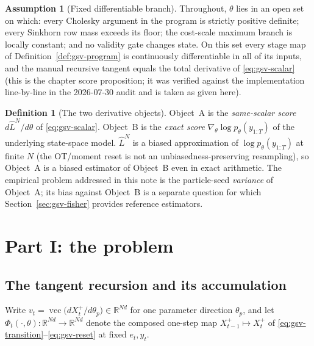 \documentclass[11pt]{article}
\theoremstyle{definition}
\newtheorem{definition}[proposition]{Definition}
\newtheorem{assumption}[proposition]{Assumption}
\theoremstyle{remark}
\begin{document}
\begin{assumption}[Fixed differentiable branch]
\label{ass:gsv-branch}
Throughout, $\theta$ lies in an open set on which: every Cholesky argument in
the program is strictly positive definite; every Sinkhorn row mass exceeds its
floor; the cost-scale maximum branch is locally constant; and no validity gate
changes state.  On this set every stage map of
Definition~\ref{def:gsv-program} is continuously differentiable in all of its
inputs, and the manual recursive tangent equals the total derivative of
\eqref{eq:gsv-scalar} (this is the chapter score proposition; it was verified
against the implementation line-by-line in the 2026-07-30 audit and is taken
as given here).
\end{assumption}

\begin{definition}[The two derivative objects]
\label{def:gsv-objects}
Object~A is the \emph{same-scalar score} $d\widehat L^N/d\theta$ of
\eqref{eq:gsv-scalar}.  Object~B is the \emph{exact score}
$\nabla_\theta \log p_\theta(y_{1:T})$ of the underlying state-space model.
$\widehat L^N$ is a biased approximation of $\log p_\theta(y_{1:T})$ at
finite $N$ (the OT/moment reset is not an unbiasedness-preserving
resampling), so Object~A is a biased estimator of Object~B even in exact
arithmetic.  The empirical problem addressed in this note is the
particle-seed \emph{variance} of Object~A; its bias against Object~B is a
separate question for which Section~\ref{sec:gsv-fisher} provides reference
estimators.
\end{definition}

\section{Part I: the problem}
\label{sec:gsv-problem}

\subsection{The tangent recursion and its accumulation}

Write $v_t=\operatorname{vec}\!\big(dX_t^{+}/d\theta_p\big)\in\mathbb{R}^{Nd}$
for one parameter direction $\theta_p$, and let
$\Phi_t(\cdot,\theta):\mathbb{R}^{Nd}\to\mathbb{R}^{Nd}$ denote the composed
one-step map $X_{t-1}^{+}\mapsto X_t^{+}$ of
\eqref{eq:gsv-transition}--\eqref{eq:gsv-reset} at fixed $e_t,y_t$.
\end{document}
